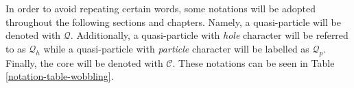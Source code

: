 In order to avoid repeating certain words, some notations will be adopted throughout the following sections and chapters. Namely, a quasi-particle will be denoted with $\mathcal{Q}$. Additionally, a quasi-particle with \emph{hole} character will be referred to as $\mathcal{Q}_h$ while a quasi-particle with \emph{particle} character will be labelled as $\mathcal{Q}_p$. Finally, the core will be denoted with $\mathscr{C}$. These notations can be seen in Table \ref{notation-table-wobbling}.
\begin{table}
    \centering
    \caption{The adopted notations for describing odd-$A$ nuclei by means of particles and angular momenta. These symbols will be used throughout the rest of the work.}
    \label{notation-table-wobbling}
\end{table}

